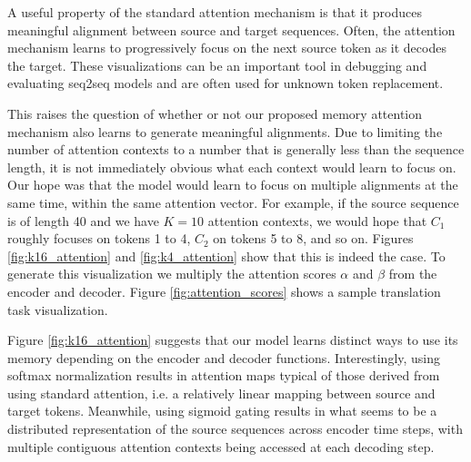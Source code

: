 \documentclass[11pt,letterpaper]{article}
\begin{document}
A useful property of the standard attention mechanism is that it produces meaningful alignment between source and target sequences. Often, the attention mechanism learns to progressively focus on the next source token as it decodes the target. These visualizations can be an important tool in debugging and evaluating seq2seq models and are often used for unknown token replacement.

This raises the question of whether or not our proposed memory attention mechanism also learns to generate meaningful alignments. Due to limiting the number of attention contexts to a number that is generally less than the sequence length, it is not immediately obvious what each context would learn to focus on. Our hope was that the model would learn to focus on multiple alignments at the same time, within the same attention vector. For example, if the source sequence is of length 40 and we have $K=10$ attention contexts, we would hope that $C_1$ roughly focuses on tokens 1 to 4, $C_2$ on tokens 5 to 8, and so on. Figures \ref{fig:k16_attention} and \ref{fig:k4_attention} show that this is indeed the case. To generate this visualization we multiply the attention scores $\alpha$ and $\beta$ from the encoder and decoder. Figure \ref{fig:attention_scores} shows a sample translation task visualization.

Figure \ref{fig:k16_attention} suggests that our model learns distinct ways to use its memory depending on the encoder and decoder functions. Interestingly, using softmax normalization results in attention maps typical of those derived from using standard attention, i.e. a relatively linear mapping between source and target tokens. Meanwhile, using sigmoid gating results in what seems to be a distributed representation of the source sequences across encoder time steps, with multiple contiguous attention contexts being accessed at each decoding step.


\end{document}
